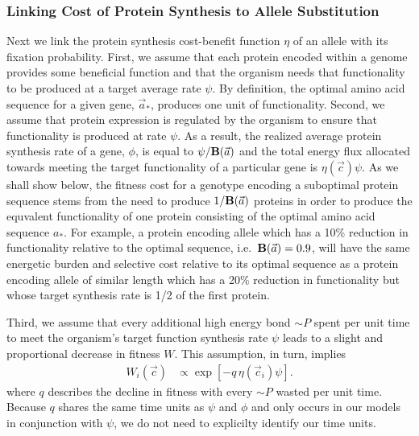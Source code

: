 \documentclass{article}
\newcommand{\Func}{\ensuremath{\text{\textbf{B}}}\xspace}
\newcommand{\simP}{\ensuremath{\sim P}\xspace}
\newcommand{\aopt}{\ensuremath{a_*}\xspace}
\newcommand{\aoptvec}{\ensuremath{\Vec{a}_*}\xspace}
\newcommand{\avec}{\ensuremath{\Vec{a}}\xspace}
\newcommand{\cveci}{\ensuremath{\cvec_i}\xspace}
\newcommand{\cvec}{\ensuremath{\Vec{c}}\xspace}
\begin{document}
\subsubsection*{Linking Cost of Protein Synthesis to Allele Substitution}
Next we link the protein synthesis cost-benefit function $\eta$ of an allele with its fixation probability.
First, we assume that each protein encoded within a genome provides some beneficial function and that the organism needs that functionality to be produced at a target average rate $\psi$.
By definition, the optimal amino acid sequence for a given gene, \aoptvec, produces one unit of functionality.
Second, we assume that protein expression is regulated by the organism to ensure that functionality is produced at rate $\psi$.
As a result, the realized average protein synthesis rate of a gene, $\phi$, is equal to $\psi/\Func(\avec)$ and the total energy flux allocated towards meeting the target functionality of a particular gene is $\eta(\cvec) \psi$.
As we shall show below, the fitness cost for a genotype encoding a suboptimal protein sequence stems from the need to produce $1/\Func(\avec)$ proteins in order to produce the equvalent functionality of one protein consisting of the optimal amino acid sequence \aopt.
      For example, a protein encoding allele which has a 10\% reduction in functionality relative to the optimal sequence, i.e.~$\Func(\avec) = 0.9$, will have the same energetic burden and selective cost relative to its optimal sequence as a protein encoding allele of similar length which has a 20\% reduction in functionality but whose target synthesis rate is 1/2 of the first protein.


Third, we assume that every additional high energy bond \simP spent per unit time to meet the organism's target function synthesis rate $\psi$ leads to a slight and proportional decrease in fitness $W$.
This assumption, in turn, implies
\begin{align}
  W_i\left(\cvec\right) &\propto \exp\left[- q \, \eta(\cveci) \psi\right].
\end{align}
where $q$ describes the decline in fitness with every \simP wasted per unit time.
Because $q$ shares the same time units as $\psi$ and $\phi$ and only occurs in our models in conjunction with $\psi$, we do not need to explicilty identify our time units.
\end{document}
